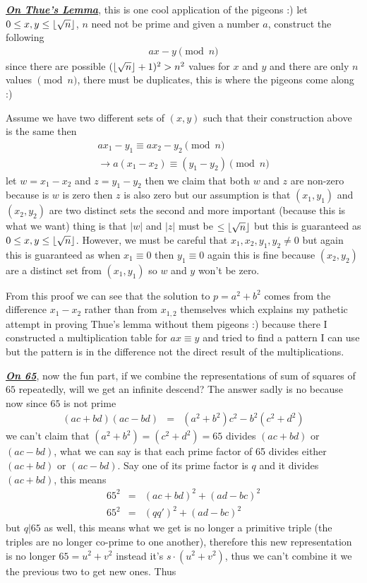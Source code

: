 \documentclass[aps,preprint,preprintnumbers,nofootinbib,showpacs,prd]{revtex4-1}
\newcommand{\nbea}{\begin{eqnarray*}}
\newcommand{\neea}{\end{eqnarray*}}
\DeclarePairedDelimiter{\floor}{\lfloor}{\rfloor}
\begin{document}
\underline{\textit{\textbf{On Thue's Lemma}}}, this is one cool application of the pigeons :) let $0 \le x,y \le \floor{\sqrt{n}}$, $n$ need not be prime and given a number $a$, construct the following
%
\nbea
ax - y \pmod{n}
\neea
%
since there are possible $(\floor{\sqrt{n}} + 1)^2 > n^2$ values for $x$ and $y$ and there are only $n$ values $\pmod{n}$, there must be duplicates, this is where the pigeons come along :)

Assume we have two different sets of $(x,y)$ such that their construction above is the same then
%
\nbea
ax_1 - y_1 \equiv ax_2 - y_2 \pmod{n} \\
\to a(x_1 - x_2) \equiv (y_1 - y_2) \pmod{n}
\neea
%
let $w = x_1 - x_2$ and $z = y_1 - y_2$ then we claim that both $w$ and $z$ are non-zero because is $w$ is zero then $z$ is also zero but our assumption is that $(x_1,y_1)$ and $(x_2,y_2)$ are two distinct sets the second and more important (because this is what we want) thing is that $|w|$ and $|z|$ must be $\le \floor{\sqrt{n}}$ but this is guaranteed as $0 \le x,y \le \floor{\sqrt{n}}$. However, we must be careful that $x_1,x_2,y_1,y_2 \neq 0$ but again this is guaranteed as when $x_1 \equiv 0$ then $y_1 \equiv 0$ again this is fine because $(x_2,y_2)$ are a distinct set from $(x_1,y_1)$ so $w$ and $y$ won't be zero.

From this proof we can see that the solution to $p = a^2 + b^2$ comes from the difference $x_1-x_2$ rather than from $x_{1,2}$ themselves which explains my pathetic attempt in proving Thue's lemma without them pigeons :) because there I constructed a multiplication table for $ax \equiv y$ and tried to find a pattern I can use but the pattern is in the difference not the direct result of the multiplications.

\underline{\textit{\textbf{On 65}}}, now the fun part, if we combine the representations of sum of squares of $65$ repeatedly, will we get an infinite descend? The answer sadly is no because now since $65$ is not prime
%
\nbea
(ac + bd)(ac - bd) & = & (a^2 + b^2)c^2 - b^2(c^2 + d^2)
\neea
%
we can't claim that $(a^2 + b^2) = (c^2 + d^2) = 65$ divides $(ac + bd)$ or $(ac - bd)$, what we can say is that each prime factor of 65 divides either $(ac + bd)$ or $(ac - bd)$. Say one of its prime factor is $q$ and it divides $(ac + bd)$, this means
%
\nbea
65^2 & = & (ac + bd)^2 + (ad - bc)^2 \\
65^2 & = & (qq')^2 + (ad - bc)^2
\neea
%
but $q|65$ as well, this means what we get is no longer a primitive triple (the triples are no longer co-prime to one another), therefore this new representation is no longer $65 = u^2 + v^2$ instead it's $s\cdot(u^2 + v^2)$, thus we can't combine it we the previous two to get new ones. Thus
\end{document}
